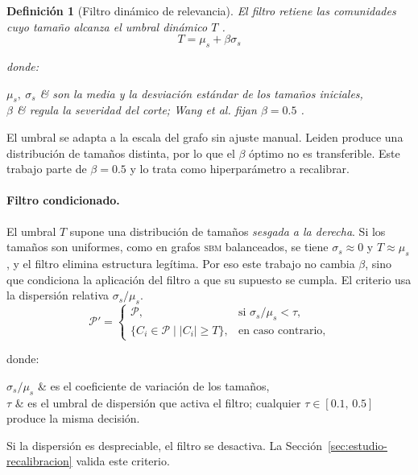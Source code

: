 \documentclass[twoside,twocolumn,10pt]{article}
\makeatletter
\newtheorem{definition}{Definición}
\newenvironment{where}{%
    \par\noindent donde:\nopagebreak\par\smallskip
    \noindent\tabularx{\linewidth}{@{\hspace{1em}}l@{\ \ }X}%
}{%
    \endtabularx\par\medskip%
}
\makeatother
\begin{document}
\begin{definition}[Filtro dinámico de relevancia]
\label{def:filtro-dinamico}
El filtro retiene las comunidades cuyo tamaño alcanza el umbral dinámico $T$ \cite{Wang2025}.
\begin{equation}
T = \mu_s + \beta \sigma_s
\end{equation}
\begin{where}
    $\mu_s,\ \sigma_s$ & son la media y la desviación estándar de los tamaños iniciales, \\
    $\beta$ & regula la severidad del corte; Wang et al. fijan $\beta = 0.5$ \cite{Wang2025}.
\end{where}
\end{definition}

El umbral se adapta a la escala del grafo sin ajuste manual. Leiden produce una distribución de tamaños distinta, por lo que el $\beta$ óptimo no es transferible. Este trabajo parte de $\beta = 0.5$ y lo trata como hiperparámetro a recalibrar.

\paragraph{Filtro condicionado.}
El umbral $T$ supone una distribución de tamaños \emph{sesgada a la derecha}. Si los tamaños son uniformes, como en grafos \textsc{sbm} balanceados, se tiene $\sigma_s \approx 0$ y $T \approx \mu_s$, y el filtro elimina estructura legítima. Por eso este trabajo no cambia $\beta$, sino que condiciona la aplicación del filtro a que su supuesto se cumpla. El criterio usa la dispersión relativa $\sigma_s/\mu_s$.
\begin{equation}
\mathcal{P}' =
\begin{cases}
\mathcal{P}, & \text{si } \sigma_s / \mu_s < \tau, \\
\{ C_i \in \mathcal{P} \mid |C_i| \geq T \}, & \text{en caso contrario,}
\end{cases}
\label{eq:filtro-condicionado}
\end{equation}
\begin{where}
    $\sigma_s / \mu_s$ & es el coeficiente de variación de los tamaños, \\
    $\tau$ & es el umbral de dispersión que activa el filtro; cualquier $\tau \in [0.1,\, 0.5]$ produce la misma decisión.
\end{where}
Si la dispersión es despreciable, el filtro se desactiva. La Sección~\ref{sec:estudio-recalibracion} valida este criterio.
\end{document}
